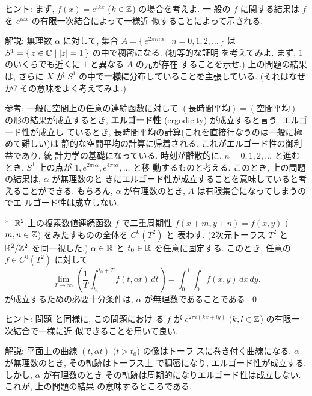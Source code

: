 \documentclass[12pt,twoside]{jarticle}
\def\qstar#1{$\!\!\!$#1$\;$}
\def\Z{{\Bbb Z}} %
\def\R{{\Bbb R}} %
\def\C{{\Bbb C}} %
\begin{document}
\noindent ヒント: まず, $f(x) = e^{ikx}$ ($k\in\Z$) の場合を考えよ. 一
般の $f$ に関する結果は $f$ を $e^{ikx}$ の有限一次結合によって一様近
似することによって示される.

\noindent 解説: 無理数 $\alpha$ に対して, %
集合 $A = \{\, e^{2\pi i n \alpha} \mid n = 0,1,2,\ldots \,\}$ %
は $S^1 = \{\, z\in\C \mid |z|=1 \,\}$ の中で稠密になる. (初等的な証明
を考えてみよ. まず, $1$ のいくらでも近くに $1$ と異なる $A$ の元が存在
することを示せ.) 上の問題の結果は, %
さらに $X$ が $S^1$ の中で{\bf 一様に}分布していることを主張している. 
(それはなぜか? その意味をよく考えてみよ.)

\noindent 参考: 一般に空間上の任意の連続函数に対して %
$(\text{長時間平均}) = (\text{空間平均})$ の形の結果が成立するとき, %
{\bf エルゴード性} (ergodicity) が成立すると言う. エルゴード性が成立し
ているとき, 長時間平均の計算(これを直接行なうのは一般に極めて難しい)は
静的な空間平均の計算に帰着される. これがエルゴード性の御利益であり, 統
計力学の基礎になっている. 
時刻が離散的に, $n = 0,1,2,\ldots$ と進むとき, %
$S^1$ 上の点が $1, e^{2\pi i \alpha}, e^{4\pi i \alpha}, \ldots$ と移
動するものと考える. このとき, 上の問題の結果は, $\alpha$ が無理数のと
きにエルゴード性が成立することを意味していると考えることができる. %
もちろん, $\alpha$ が有理数のとき, $A$ は有限集合になってしまうのでエ
ルゴード性は成立しない.

\begin{question}\qstar{*}\label{q:ergodicity2}
  $\R^2$ 上の複素数値連続函数 $f$ で二重周期性 %
  $f(x+m,y+n)=f(x,y)$ ($m,n\in\Z$) をみたすものの全体を $C^0(T^2)$ と
  表わす. (2次元トーラス $T^2$ と $\R^2/\Z^2$ を同一視した.) %
  $\alpha\in\R$ と $t_0\in\R$ を任意に固定する. %
  このとき, 任意の $f \in C^0(T^2)$ に対して 
  \[
    \lim_{T\to\infty}
    \left(
      \frac{1}{T}
      \int_{t_0}^{t_0+T} f(t, \alpha t) \,dt
    \right)
    =
    \int_0^1 \int_0^1 f(x,y) \,dx\,dy.
  \]
  が成立するための必要十分条件は, $\alpha$ が無理数であることである.
  \qed
\end{question}

\noindent ヒント: 問題  と同様に, この問題におけ
る $f$ が $e^{2\pi i(kx + ly)}$ ($k,l\in\Z$) の有限一次結合で一様に近
似できることを用いて良い.

\noindent 解説: 平面上の曲線 $(t, \alpha t)$ ($t > t_0$) の像はトーラ
スに巻き付く曲線になる.  $\alpha$ が無理数のとき, その軌跡はトーラス上
で稠密になり, エルゴード性が成立する. しかし, $\alpha$ が有理数のとき
その軌跡は周期的になりエルゴード性は成立しない. これが, 上の問題の結果
の意味するところである.
\end{document}
